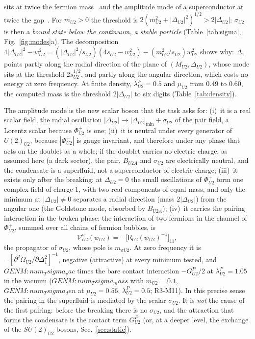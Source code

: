 sits at twice the fermion mass~\cite{NJL1961} and the amplitude mode of a superconductor at twice
the gap~\cite{LittlewoodVarma1982}. For $m_{U2}>0$ the threshold is
$2(m^2_{U2}+|\Delta_{U2}|^2)^{1/2}>2|\Delta_{U2}|$: $\sigma_{U2}$ is then a \emph{bound state below the
continuum, a stable particle} (Table~\ref{tab:sigma}, Fig.~\ref{fig:modes}a). The decomposition
$4|\Delta_{U2}|^2-w^2_{U2}=(|\Delta_{U2}|^2/s_{U2})(4s_{U2}-w^2_{U2})-(m^2_{U2}/s_{U2})w^2_{U2}$ shows
why: $\Delta_1$ points partly along the radial direction of the plane of $(M_{U2},\Delta_{U2})$, whose
mode sits at the threshold $2s^{1/2}_{U2}$, and partly along the angular direction, which costs no
energy at zero frequency. At finite density, $\lambda^P_{U2}=0.5$ and $\mu_{U2}$ from 0.49 to 0.60,
the computed mass is the threshold $2|\Delta_{U2}|$ to six digits (Table~\ref{tab:density}).

The amplitude mode is the new scalar boson that the task asks for:
(i)~it is a real scalar field, the radial oscillation $|\Delta_{U2}|\to|\Delta_{U2}|_{\min}+\sigma_{U2}$
of the pair field, a Lorentz scalar because $\Phi^+_{U2}$ is one;
(ii)~it is neutral under every generator of $U(2)_{U2}$, because $|\Phi^+_{U2}|$ is gauge invariant,
and therefore under any phase that acts on the doublet as a whole; if the doublet carries no
electric charge, as assumed here (a dark sector), the pair, $B_{U2A}$ and $\sigma_{U2}$ are
electrically neutral, and the condensate is a superfluid, not a superconductor of electric charge;
(iii)~it exists only after the breaking: at $\Delta_{U2}=0$ the small oscillations of $\Phi^+_{U2}$ form
one complex field of charge 1, with two real components of equal mass, and only the minimum at
$|\Delta_{U2}|\neq0$ separates a radial direction (mass $2|\Delta_{U2}|$) from the angular one (the
Goldstone mode, absorbed by $B_{U2A}$);
(iv)~it carries the pairing interaction in the broken phase: the interaction of two fermions in the
channel of $\Phi^+_{U2}$, summed over all chains of fermion bubbles, is
\begin{equation}
\mathcal V^\sigma_{U2}(w_{U2})=-\big[\mathsf R_{U2}(w_{U2})^{-1}\big]_{11},
\label{eq:Vsigma}
\end{equation}
the propagator of $\sigma_{U2}$, whose pole is $m_{\sigma U2}$. At zero frequency it is
$-[\partial^2\Omega_{U2}/\partial\Delta_1^2]^{-1}$, negative (attractive) at every minimum tested, and
${{GENM:num_Tsigma_vac}}$ times the bare contact interaction $-G^P_{U2}/2$ at $\lambda^P_{U2}=1.05$ in
the vacuum (${{GENM:num_Tsigma_mass}}$ with $m_{U2}=0.1$, ${{GENM:num_Tsigma_den}}$ at $\mu_{U2}=0.56$,
$\lambda^P_{U2}=0.5$; R3-M11). In this precise sense the pairing in the superfluid is mediated by the
scalar $\sigma_{U2}$. It is \emph{not} the cause of the first pairing: before the breaking there is no
$\sigma_{U2}$, and the attraction that forms the condensate is the contact term $G^P_{U2}$ (or, at a
deeper level, the exchange of the $SU(2)_{U2}$ bosons, Sec.~\ref{sec:static}).

